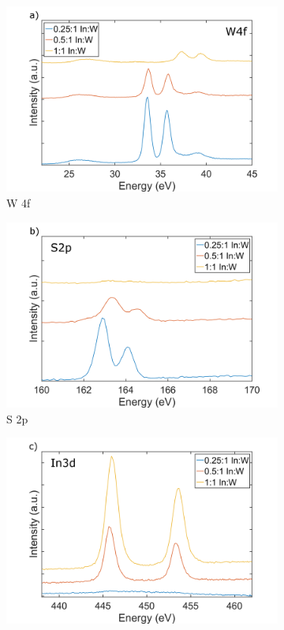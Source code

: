 \begin{figure}[!h]
	\begin{center}
		\begin{subfigure}[b]{0.6\textwidth}
			\includegraphics[width=\textwidth]{In/XPSW4f.png}
			\caption{W 4f}
			\label{fig:InXPSW4f}
		\end{subfigure}
		\qquad
		\begin{subfigure}[b]{0.6\textwidth}
			\includegraphics[width=\textwidth]{In/XPSS2p.png}
			\caption{S 2p}
			\label{fig:InXPSS2p}
		\end{subfigure}
		\begin{subfigure}[b]{0.6\textwidth}
			\includegraphics[width=\textwidth]{In/XPSIn3d.png}

\end{subfigure}
\end{center}
\end{figure}
